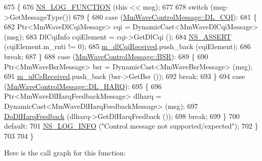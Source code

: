 \begin{DoxyCode}
675 \{
676         \hyperlink{log-macros-disabled_8h_a90b90d5bad1f39cb1b64923ea94c0761}{NS\_LOG\_FUNCTION} (\textcolor{keyword}{this} << msg);
677 
678         \textcolor{keywordflow}{switch} (msg->GetMessageType())
679         \{
680                 \textcolor{keywordflow}{case} (\hyperlink{classns3_1_1MmWaveControlMessage_afd7af53dea4ef8b652cf206acd508869a86a81d8d22142bcbb5be5abe46eddb97}{MmWaveControlMessage::DL\_CQI}):
681                 \{
682                         Ptr<MmWaveDlCqiMessage> cqi = DynamicCast<MmWaveDlCqiMessage> (msg);
683                         DlCqiInfo cqiElement = cqi->GetDlCqi ();
684                         \hyperlink{assert_8h_a6dccdb0de9b252f60088ce281c49d052}{NS\_ASSERT} (cqiElement.m\_rnti != 0);
685                         \hyperlink{classns3_1_1MmWaveEnbMac_a051d16bd2a2abb3389efb160f680116d}{m\_dlCqiReceived}.push\_back (cqiElement);
686                         \textcolor{keywordflow}{break};
687                 \}
688                 \textcolor{keywordflow}{case} (\hyperlink{classns3_1_1MmWaveControlMessage_afd7af53dea4ef8b652cf206acd508869ae6dfe19c64eac4df7cf4603d0ca69fd4}{MmWaveControlMessage::BSR}):
689                 \{
690                         Ptr<MmWaveBsrMessage> bsr = DynamicCast<MmWaveBsrMessage> (msg);
691                         \hyperlink{classns3_1_1MmWaveEnbMac_a7046f8a9936884f8d38e139a33db01a4}{m\_ulCeReceived}.push\_back (bsr->GetBsr ());
692                         \textcolor{keywordflow}{break};
693                 \}
694                 \textcolor{keywordflow}{case} (\hyperlink{classns3_1_1MmWaveControlMessage_afd7af53dea4ef8b652cf206acd508869a8c97d0661ffe92534bc6479bc6d8ff45}{MmWaveControlMessage::DL\_HARQ}):
695           \{
696                         Ptr<MmWaveDlHarqFeedbackMessage> dlharq = DynamicCast<MmWaveDlHarqFeedbackMessage> 
      (msg);
697                         \hyperlink{classns3_1_1MmWaveEnbMac_acb69fd90fb5f096af1c0397beefe96a9}{DoDlHarqFeedback} (dlharq->GetDlHarqFeedback ());
698                         \textcolor{keywordflow}{break};
699           \}
700                 \textcolor{keywordflow}{default}:
701                         \hyperlink{group__logging_gafbd73ee2cf9f26b319f49086d8e860fb}{NS\_LOG\_INFO} (\textcolor{stringliteral}{"Control message not supported/expected"});
702         \}
703 
704 \}
\end{DoxyCode}


Here is the call graph for this function\+:




